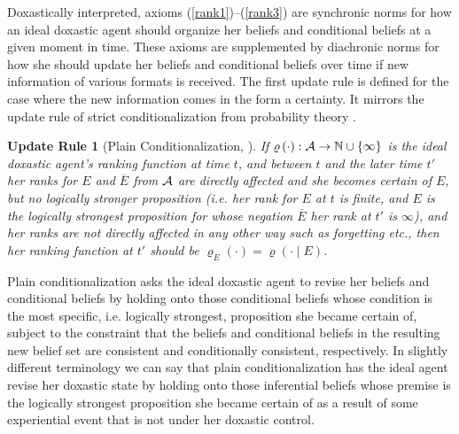 Doxastically interpreted, axioms (\ref{rank1})--(\ref{rank3}) are synchronic norms for how an ideal doxastic agent should organize her beliefs and conditional beliefs at a given moment in time. These axioms are supplemented by diachronic norms for how she should update her beliefs and conditional beliefs over time if new information of various formats is received. The first update rule is defined for the case where the new information comes in the form a certainty. It mirrors the update rule of strict conditionalization from probability theory \citep{v00}.
\newtheorem{update}{Update Rule}
\begin{update}[Plain Conditionalization, \citealt{s88}]\label{rankrule1}
If $\varrho\left(\cdot\right):\begin{cal}A\end{cal}\rightarrow\mathbb{N}\cup\left\{\infty\right\}$ is the ideal doxastic agent's ranking function at time $t$, and between $t$ and the later time $t'$ her ranks for $E$ and $\overline{E}$ from $\begin{cal}A\end{cal}$ are directly affected and she becomes certain of $E$, but no logically stronger proposition (i.e. her rank for $E$ at $t$ is finite, and $E$ is the logically strongest proposition for whose negation $\overline{E}$ her rank at $t'$ is $\infty$), and her ranks are not directly affected in any other way such as forgetting etc., then her ranking function at $t'$ should be $\varrho_E\left(\cdot\right)=\varrho\left(\cdot\mid E\right)$.
\end{update}
Plain conditionalization asks the ideal doxastic agent to revise her beliefs and conditional beliefs by holding onto those conditional beliefs whose condition is the most specific, i.e. logically strongest, proposition she became certain of, subject to the constraint that the beliefs and conditional beliefs in the resulting new belief set are consistent and conditionally consistent, respectively. In slightly different terminology we can say that plain conditionalization has the ideal agent revise her doxastic state by holding onto those inferential beliefs whose premise is the logically strongest proposition she became certain of as a result of some experiential event that is not under her doxastic control.

